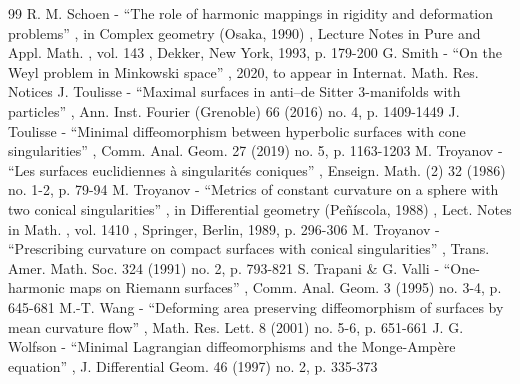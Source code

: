 \documentclass[11pt]{article}
\theoremstyle{definition}
\begin{document}
\begin{thebibliography}{99}
 R. M. Schoen - “The role of harmonic mappings in rigidity and deformation problems” , in Complex geometry (Osaka, 1990) , Lecture Notes in Pure and Appl. Math. , vol. 143 , Dekker, New York, 1993, p. 179-200
 G. Smith - “On the Weyl problem in Minkowski space” , 2020, to appear in Internat. Math. Res. Notices
 J. Toulisse - “Maximal surfaces in anti–de Sitter 3-manifolds with particles” , Ann. Inst. Fourier (Grenoble) 66 (2016) no. 4, p. 1409-1449
 J. Toulisse - “Minimal diffeomorphism between hyperbolic surfaces with cone singularities” , Comm. Anal. Geom. 27 (2019) no. 5, p. 1163-1203
 M. Troyanov - “Les surfaces euclidiennes à singularités coniques” , Enseign. Math. (2) 32 (1986) no. 1-2, p. 79-94
 M. Troyanov - “Metrics of constant curvature on a sphere with two conical singularities” , in Differential geometry (Peñíscola, 1988) , Lect. Notes in Math. , vol. 1410 , Springer, Berlin, 1989, p. 296-306
 M. Troyanov - “Prescribing curvature on compact surfaces with conical singularities” , Trans. Amer. Math. Soc. 324 (1991) no. 2, p. 793-821
 S. Trapani \& G. Valli - “One-harmonic maps on Riemann surfaces” , Comm. Anal. Geom. 3 (1995) no. 3-4, p. 645-681
 M.-T. Wang - “Deforming area preserving diffeomorphism of surfaces by mean curvature flow” , Math. Res. Lett. 8 (2001) no. 5-6, p. 651-661
 J. G. Wolfson - “Minimal Lagrangian diffeomorphisms and the Monge-Ampère equation” , J. Differential Geom. 46 (1997) no. 2, p. 335-373
\end{thebibliography}
\end{document}

